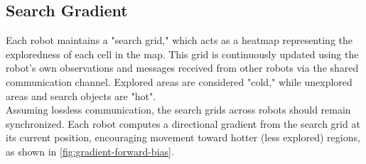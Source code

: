 \subsection{Search Gradient}
\label{sec:search-gradient}

Each robot maintains a "search grid," which acts as a heatmap representing the exploredness of each cell in the map. This grid is continuously updated using the robot’s own observations and messages received from other robots via the shared communication channel. Explored areas are considered "cold," while unexplored areas and search objects are "hot".  \\

Assuming lossless communication, the search grids across robots should remain synchronized. Each robot computes a directional gradient from the search grid at its current position, encouraging movement toward hotter (less explored) regions, as shown in \cref{fig:gradient-forward-bias}.

